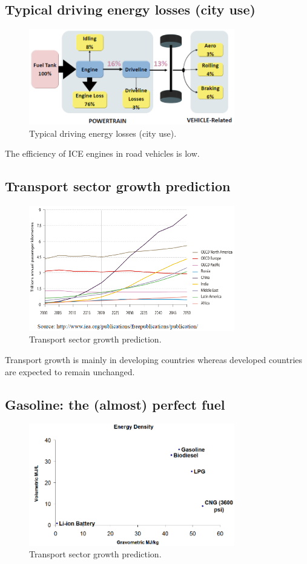 \subsection{Typical driving energy losses (city use)}
\begin{figure}[H]
    \centering
    \includegraphics[width = 0.8\textwidth]{img/figure93.png}
    \caption{Typical driving energy losses (city use).}
\end{figure}
The efficiency of ICE engines in road vehicles is low.
\subsection{Transport sector growth prediction}
\begin{figure}[H]
    \centering
    \includegraphics[width = 0.8\textwidth]{img/figure94.png}
    \caption{Transport sector growth prediction.}
\end{figure}
Transport growth is mainly in developing countries whereas developed countries are expected to remain unchanged.
\subsection{Gasoline: the (almost) perfect fuel}
\begin{figure}[H]
    \centering
    \includegraphics[width = 0.8\textwidth]{img/figure95.png}
    \caption{Transport sector growth prediction.}
\end{figure}
